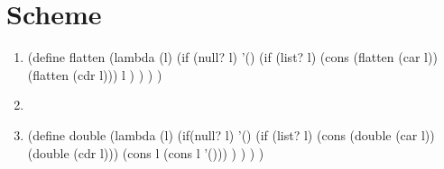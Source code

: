 \documentclass[11pt]{article}
\begin{document}
\section{Scheme}

\begin{enumerate}
	\item
    (define flatten
      (lambda (l)
        (if (null? l)
	      '()
	      (if (list? l)
		    (cons (flatten (car l)) (flatten (cdr l)))
		    l
	      )
	    )
      )
    )
	\item
	\item

(define double
  (lambda (l)
    (if(null? l) 
	  '()
	  (if (list? l)
	    (cons (double (car l))  (double (cdr l)))
	  (cons l (cons l '()))
	  )
    )
  )
)

\end{enumerate}
\end{document}
